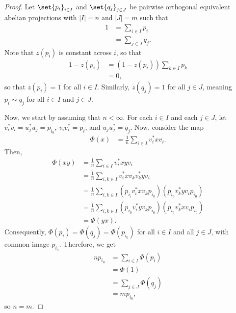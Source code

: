 \documentclass[10pt]{mypackage}
\begin{document}
\begin{proof}
  Let $\set{p_i}_{i\in I}$ and $\set{q_j}_{j\in J}$ be pairwise orthogonal equivalent abelian projections with $\left\vert I \right\vert = n$ and $\left\vert J \right\vert = m$ such that
  \begin{align*}
    1 &= \sum_{i\in I} p_i \\
      &= \sum_{j\in J}q_j.
  \end{align*}
  Note that $z\left( p_i \right)$ is constant across $i$, so that
  \begin{align*}
    1-z\left( p_i \right) &= \left( 1-z\left( p_i \right) \right)\sum_{k\in I}p_k\\
                          &= 0,
  \end{align*}
  so that $z\left( p_i \right) = 1$ for all $i\in I$. Similarly, $z\left( q_j \right) = 1$ for all $j\in J$, meaning $p_i\sim q_j$ for all $i\in I$ and $j\in J$.

  Now, we start by assuming that $n < \infty$. For each $i\in I$ and each $j\in J$, let $v_i^{\ast}v_i = u_j^{\ast}u_j = p_{i_0}$, $v_iv_i^{\ast} = p_i$, and $u_ju_j^{\ast} = q_j$. Now, consider the map
  \begin{align*}
    \Phi(x) &= \frac{1}{n}\sum_{i\in I}v_i^{\ast}xv_i.
  \end{align*}
  Then,
  \begin{align*}
    \Phi\left( xy \right) &= \frac{1}{n}\sum_{i\in I}v_i^{\ast}xyv_i\\
                          &= \frac{1}{n}\sum_{i,k\in I}v_i^{\ast}xv_kv_k^{\ast}yv_i\\
                          &= \frac{1}{n}\sum_{i,k\in I} \left( p_{i_i}v_i^{\ast}xv_kp_{i_0} \right)\left( p_{i_0}v_k^{\ast}yv_ip_{i_0} \right)\\
                          &= \frac{1}{n}\sum_{i,k\in I} \left( p_{i_0}v_i^{\ast}yv_kp_{i_0} \right)\left( p_{i_0}v_k^{\ast}xv_ip_{i_0} \right)\\
                          &= \Phi\left( yx \right).
  \end{align*}
  Consequently, $\Phi\left( p_i \right) = \Phi\left( q_j \right) = \Phi\left( p_{i_0} \right)$ for all $i\in I$ and all $j\in J$, with common image $p_{i_0}$. Therefore, we get
  \begin{align*}
    np_{i_0} &= \sum_{i\in I}\Phi\left( p_i \right)\\
             &= \Phi\left( 1 \right)\\
             &= \sum_{j\in J}\Phi\left( q_j \right)\\
             &= mp_{i_0},
  \end{align*}
  so $n = m$.


\end{proof}
\end{document}
